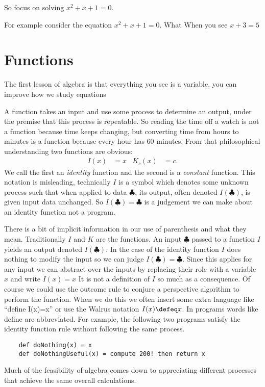 So focus on solving $x^2+x+1=0$.  


For example consider the equation $x^2+x+1=0$.  What 
When you see $x+3=5$


\chapter{Functions}

The first lesson of algebra is that everything you see is a variable. you can improve how we study equations 

A function takes an input and use some process to determine an output,
under the premise that this process is repeatable.  So reading the 
time off a watch is not a function because time keeps changing, 
but converting time from hours to minutes is a function because 
every hour has 60 minutes.  From that philosophical understanding 
two functions are obvious:
\begin{align*}
    I(x) & = x & 
    K_c(x) & = c.
\end{align*}
We call the first an \emph{identity} function and the second is a \emph{constant}
function.  This notation is misleading, technically $I$ is a symbol
which denotes some unknown process such that when applied to data $\clubsuit$,
its output, often denoted $I(\clubsuit)$, is given input data unchanged.
So $I(\clubsuit)=\clubsuit$ is a judgement we can make about an identity 
function not a program.

There is a bit of implicit information in our use 
of parenthesis and what they mean.  Traditionally $I$ and $K$ are 
the functions.  An input $\clubsuit$ passed to a function $I$ 
yields an output denoted $I(\clubsuit)$.  In the case of the identity 
function $I$ does nothing to modify the input so we can judge 
$I(\clubsuit)=\clubsuit$.  Since this applies for any input we 
can abstract over the inputs by replacing their role with a variable 
$x$ and write $I(x)=x$  It is not a definition of $I$ so much as 
a consequence.  Of course we could use the outcome rule to conjure 
a perspective algorithm to perform the function.  When we do this 
we often insert some extra language like ``define I(x)=x'' or 
use the Walrus notation $I(x)\defeq x$.  In programs words like 
define are abbreviated.  For example, the following two programs satisfy
the identity function rule without following the same process.
\begin{lstlisting}
    def doNothing(x) = x 
    def doNothingUseful(x) = compute 200! then return x
\end{lstlisting}
Much of the feasibility of algebra comes down to appreciating 
different processes that achieve the same overall calculations.


